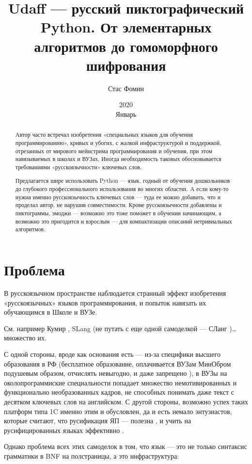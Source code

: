 ﻿\documentclass[a4paper,12pt]{article}
\title{Udaff — русский пиктографический Python. От элементарных алгоритмов до гомоморфного шифрования}
\date{2020 \\ Январь}
\author{Стас Фомин}
\begin{document}
\begin{abstract}
    Автор часто встречал изобретения «специальных языков для обучения программированию», кривых и убогих, с жалкой инфраструктурой и поддержкой, отрезанных от мирового мейнстрима программирования и обучения, при этом навязываемых в школах и ВУЗах. Иногда необходимость таковых обосновывается требованиями «русскоязычности» ключевых слов. 

    Предлагается шире использовать Python — язык, годный от обучения дошкольников до глубокого профессионального использования во многих областях. А если кому-то нужна именно русскоязычность ключевых слов — туда ее можно добавить, что и проделал автор, не нарушив совместимости. Кроме русскоязычности добавлены и пиктограммы, эмоджи — возможно это тоже поможет в обучении начинающим, а возможно это пригодится и взрослым — для компактизации описаний нетривиальных алгоритмов.
\end{abstract}

\section{Проблема}

В русскоязычном пространстве наблюдается странный эффект изобретения
«русскоязычных» языков программирования, и попыток навязать их
обучающимся в Школе и ВУЗе.  

См. например Кумир \cite{kumir}, SLang \cite{slang}
(не путать с еще одной самоделкой --- СЛанг \cite{slang2})\ldots{} множество их.
  
С одной стороны, вроде как основания есть --- из-за специфики высшего
образования в РФ (бесплатное образование, оплачивается ВУЗам МинОбром
подушевым образом, отчислять невыгодно, и даже запрещено \cite{fire-restricted}), 
в ВУЗы на околопрограммиские специальности попадает множество немотивированных и
функционально необразованных кадров, не способных понимать даже текст с
десятком ключевых слов на английском. С другой стороны, возможно успех
таких платформ типа 1C именно этим и обусловлен, да и есть немало
энтузиастов, которые
считают, что русификация ЯП --- полезна \cite{russification-good}, и
учить на русифицированных
языках эффективно \cite{russification-effective}.

Однако проблема всех этих самоделок в том, что язык --- это не только
синтаксис грамматики в BNF на полстраницы, а это инфраструктура:
\end{document}
